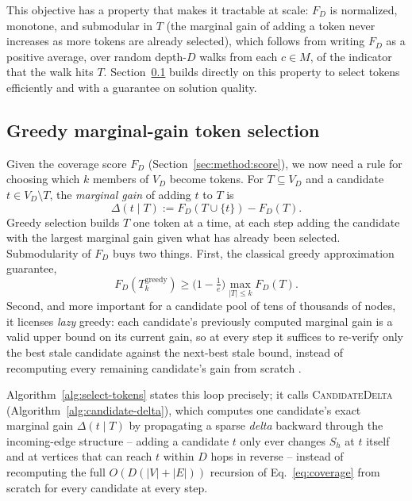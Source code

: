 This objective has a property that makes it tractable at scale: $F_D$ is
normalized, monotone, and submodular in $T$ (the marginal gain of adding a
token never increases as more tokens are already selected), which follows
from writing $F_D$ as a positive average, over random depth-$D$ walks from
each $c \in M$, of the indicator that the walk hits $T$. Section~\ref{sec:method:selection}
builds directly on this property to select tokens efficiently and with a
guarantee on solution quality.

\subsection{Greedy marginal-gain token selection}
\label{sec:method:selection}
Given the coverage score $F_D$ (Section~\ref{sec:method:score}), we now
need a rule for choosing which $k$ members of $V_D$ become tokens. For
$T \subseteq V_D$ and a candidate $t \in V_D \setminus T$, the
\emph{marginal gain} of adding $t$ to $T$ is
\[
\Delta(t \mid T) := F_D(T \cup \{t\}) - F_D(T).
\]
Greedy selection builds $T$ one token at a time, at each step adding the
candidate with the largest marginal gain given what has already been
selected. Submodularity of $F_D$ buys two things. First, the classical
greedy approximation guarantee,
\begin{equation}
F_D(T^{\text{greedy}}_k) \ge \Big(1 - \tfrac{1}{e}\Big) \max_{|T| \le k} F_D(T).
\label{eq:guarantee}
\end{equation}
Second, and more important for a candidate pool of tens of thousands of
nodes, it licenses \emph{lazy} greedy: each candidate's previously computed
marginal gain is a valid upper bound on its current gain, so at every step
it suffices to re-verify only the best stale candidate against the
next-best stale bound, instead of recomputing every remaining candidate's
gain from scratch .

Algorithm~\ref{alg:select-tokens} states this loop precisely; it calls
\textsc{CandidateDelta} (Algorithm~\ref{alg:candidate-delta}), which
computes one candidate's exact marginal gain $\Delta(t \mid T)$ by
propagating a sparse \emph{delta} backward through the incoming-edge
structure -- adding a candidate $t$ only ever changes $S_h$ at $t$ itself
and at vertices that can reach $t$ within $D$ hops in reverse -- instead of
recomputing the full $O(D(|V|+|E|))$ recursion of Eq.~\eqref{eq:coverage}
from scratch for every candidate at every step.

